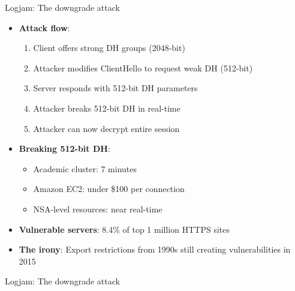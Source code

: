 \documentclass[aspectratio=169, lualatex, handout]{beamer}
\begin{document}
\begin{frame}{Logjam: The downgrade attack}
	\begin{itemize}[<+->]
		\item \textbf{Attack flow}:
		      \begin{enumerate}
			      \item Client offers strong DH groups (2048-bit)
			      \item Attacker modifies ClientHello to request weak DH (512-bit)
			      \item Server responds with 512-bit DH parameters
			      \item Attacker breaks 512-bit DH in real-time
			      \item Attacker can now decrypt entire session
		      \end{enumerate}
		\item \textbf{Breaking 512-bit DH}:
		      \begin{itemize}
			      \item Academic cluster: 7 minutes
			      \item Amazon EC2: under \$100 per connection
			      \item NSA-level resources: near real-time
		      \end{itemize}
		\item \textbf{Vulnerable servers}: 8.4\% of top 1 million HTTPS sites
		\item \textbf{The irony}: Export restrictions from 1990s still creating vulnerabilities in 2015
	\end{itemize}
\end{frame}

\begin{frame}{Logjam: The downgrade attack}
\end{frame}
\end{document}
